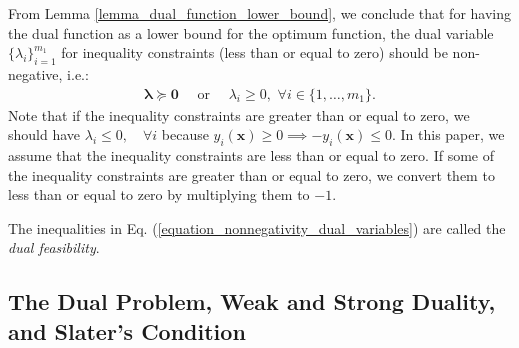 \documentclass[lang=cn,10pt]{gorgeousnbook}
\numberwithin{equation}{section}%
\numberwithin{figure}{section}%
\begin{document}
\begin{corollary}\label{corollary_nonnegativity_dual_variables}
From Lemma \ref{lemma_dual_function_lower_bound}, we conclude that for having the dual function as a lower bound for the optimum function, the dual variable $\{\lambda_i\}_{i=1}^{m_1}$ for inequality constraints (less than or equal to zero) should be non-negative, i.e.:
\begin{align}\label{equation_nonnegativity_dual_variables}
\boldsymbol{\lambda} \succeq \boldsymbol{0} \quad\text{ or }\quad \lambda_i \geq 0, \,\, \forall i \in \{1, \dots, m_1\}.
\end{align}
Note that if the inequality constraints are greater than or equal to zero, we should have $\lambda_i \leq 0, \quad \forall i$ because $y_i(\boldsymbol{x}) \geq 0 \implies -y_i(\boldsymbol{x}) \leq 0$. In this paper, we assume that the inequality constraints are less than or equal to zero. If some of the inequality constraints are greater than or equal to zero, we convert them to less than or equal to zero by multiplying them to $-1$.
\end{corollary}
The inequalities in Eq. (\ref{equation_nonnegativity_dual_variables}) are called the \textit{dual feasibility}. 

\subsection{The Dual Problem, Weak and Strong Duality, and Slater's Condition}\label{section_dual_problem}
\end{document}
